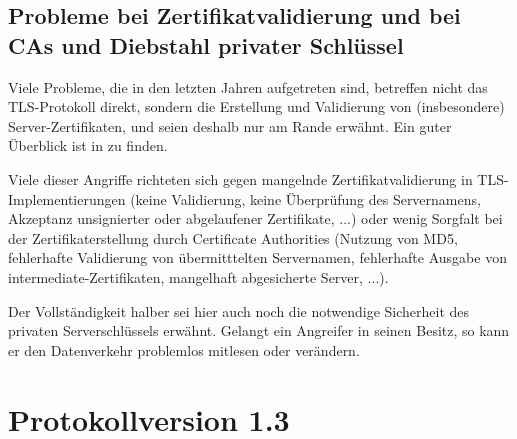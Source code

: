 \documentclass[
    12pt,
    headings=small,
    parskip=half,           %
    bibliography=totoc,
    numbers=noenddot,       %
    open=any,               %
    ]{scrreprt}
\begin{document}
\section{Probleme bei Zertifikatvalidierung und bei CAs und Diebstahl privater Schlüssel}

Viele Probleme, die in den letzten Jahren aufgetreten sind, betreffen nicht das TLS-Protokoll direkt, sondern die Erstellung und Validierung von (insbesondere) Server-Zertifikaten, und seien deshalb nur am Rande erwähnt. Ein guter Überblick ist in \cite{meyer13} zu finden.

Viele dieser Angriffe richteten sich gegen mangelnde Zertifikatvalidierung in TLS-Implementierungen (keine Validierung, keine Überprüfung des Servernamens, Akzeptanz unsignierter oder abgelaufener Zertifikate, ...) oder wenig Sorgfalt bei der Zertifikaterstellung durch Certificate Authorities (Nutzung von MD5, fehlerhafte Validierung von übermitttelten Servernamen, fehlerhafte Ausgabe von intermediate-Zertifikaten, mangelhaft abgesicherte Server, ...).

Der Vollständigkeit halber sei hier auch noch die notwendige Sicherheit des privaten Serverschlüssels erwähnt. Gelangt ein Angreifer in seinen Besitz, so kann er den Datenverkehr problemlos mitlesen oder verändern.

\chapter{Protokollversion 1.3}



\end{document}
